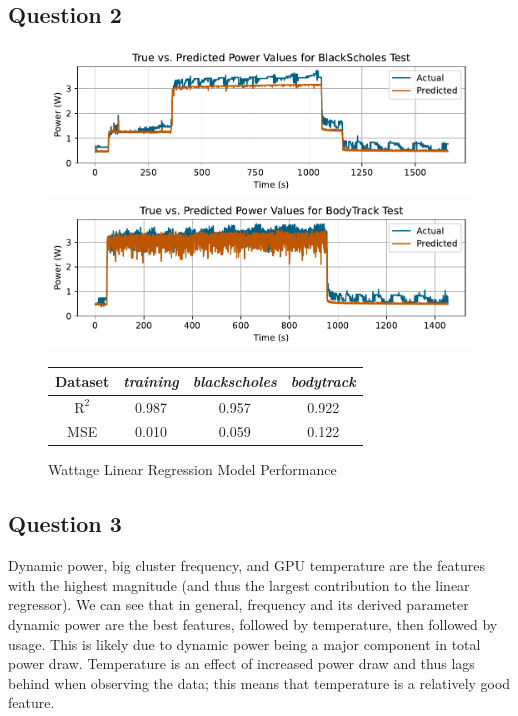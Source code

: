 \documentclass{article}
\begin{document}
\pagebreak

\subsection{Question 2}

\begin{figure} [!htb]
    \centering
    \includegraphics[scale=0.8]{blackscholes_linreg.pdf}
    \includegraphics[scale=0.8]{bodytrack_linreg.pdf}
    \label{fig:blk-body-linreg}
\end{figure}

\begin{figure} [!htb]
    \centering
    \caption{Wattage Linear Regression Model Performance}
    \begin{tabular}[!htb]{|c|c|c|c|} \hline
        Dataset & \textit{\textbf{training}} & \textit{\textbf{blackscholes}} & \textit{\textbf{bodytrack}} \\ \hline
        $\text{R}^2$ & 0.987 & 0.957 & 0.922 \\ \hline
        MSE & 0.010 & 0.059 & 0.122 \\ \hline
    \end{tabular}
    \label{fig:power-linreg}
\end{figure}

\subsection{Question 3}
Dynamic power, big cluster frequency, and GPU temperature are the features with the highest magnitude (and thus the largest contribution to the linear regressor). We can see that in general, frequency and its derived parameter dynamic power are the best features, followed by temperature, then followed by usage. This is likely due to dynamic power being a major component in total power draw. Temperature is an effect of increased power draw and thus lags behind when observing the data; this means that temperature is a relatively good feature.
\end{document}
